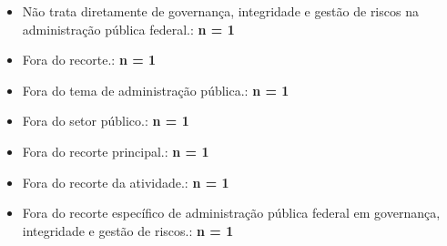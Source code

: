 \documentclass[12pt,a4paper]{article}
\begin{document}
\begin{itemize}
\begin{itemize}
\item Não trata diretamente de governança, integridade e gestão de riscos na administração pública federal.: \textbf{n = 1}
\item Fora do recorte.: \textbf{n = 1}
\item Fora do tema de administração pública.: \textbf{n = 1}
\item Fora do setor público.: \textbf{n = 1}
\item Fora do recorte principal.: \textbf{n = 1}
\item Fora do recorte da atividade.: \textbf{n = 1}
\item Fora do recorte específico de administração pública federal em governança, integridade e gestão de riscos.: \textbf{n = 1}
\end{itemize}
\end{itemize}
\end{document}
